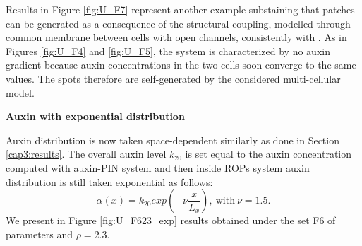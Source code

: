 Results in Figure \ref{fig:U_F7} represent another example substaining that patches can be generated as a consequence of the structural coupling, modelled through common membrane between cells with open channels, consistently with \cite{phdthesis:victor, intra1_R}. As in Figures \ref{fig:U_F4} and \ref{fig:U_F5}, the system is characterized by no auxin gradient because auxin concentrations in the two cells soon converge to the same values. The spots therefore are self-generated by the considered multi-cellular model.


\textbf{Auxin with exponential distribution}

Auxin distribution is now taken space-dependent similarly as done in Section \ref{cap3:results}. The overall auxin level $k_{20}$ is set equal to the auxin concentration computed with auxin-PIN system and then inside ROPs system auxin distribution is still taken exponential as follows:
\begin{equation*}
  \alpha(x) = k_{20} exp\left(-\nu \frac{x}{L_x}\right), \ \text{with} \ \nu = 1.5.
\end{equation*}
We present in Figure \ref{fig:U_F623_exp} results obtained under the set F6 of parameters and $\rho = 2.3$.

